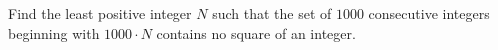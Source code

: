 Find the least positive integer $N$ such that the set of $1000$ consecutive integers beginning with $1000 \cdot N$ contains no square of an integer.